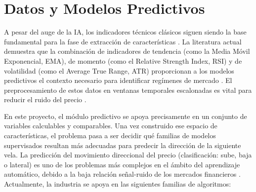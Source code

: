 \section{Datos y Modelos Predictivos}

A pesar del auge de la IA, los indicadores técnicos clásicos siguen siendo la base fundamental para la fase de extracción de características \parencite{lopez_de_prado_advances_2018}. La literatura actual demuestra que la combinación de indicadores de tendencia (como la Media Móvil Exponencial, EMA), de momento (como el Relative Strength Index, RSI) y de volatilidad (como el Average True Range, ATR) proporcionan a los modelos predictivos el contexto necesario para identificar regímenes de mercado \parencite[Caps. 9, 10 y 16]{murphy_technical_1999}. El preprocesamiento de estos datos en ventanas temporales escalonadas es vital para reducir el ruido del precio \parencite{chan_algorithmic_2013,lopez_de_prado_advances_2018}.

En este proyecto, el módulo predictivo se apoya precisamente en un conjunto de variables calculables y comparables. Una vez construido ese espacio de características, el problema pasa a ser decidir qué familias de modelos supervisados resultan más adecuadas para predecir la dirección de la siguiente vela. La predicción del movimiento direccional del precio (clasificación: sube, baja o lateral) es uno de los problemas más complejos en el ámbito del aprendizaje automático, debido a la baja relación señal-ruido de los mercados financieros \parencite{fama_efficient_1970}. Actualmente, la industria se apoya en las siguientes familias de algoritmos:

